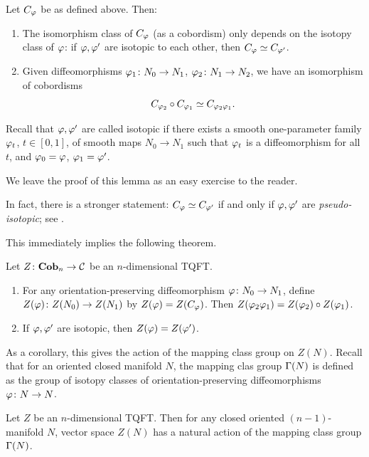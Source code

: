 \begin{lemma}\label{l:tqft-isotopy}
  Let $C_\varphi$ be as defined above. Then:
  \begin{enumerate}
    \item The isomorphism class of $C_\varphi$ \textup{(}as a cobordism\textup{)}
    only depends on the
    isotopy class of $\varphi$: if $\varphi, \varphi'$ are isotopic to each other, then
      $C_\varphi\simeq C_{\varphi'}$.
    \item Given diffeomorphisms $\varphi_1\colon N_0\to N_1$, $\varphi_2\colon N_1\to
      N_2$, we have an isomorphism of cobordisms
      $$
        C_{\varphi_2}\circ C_{\varphi_1}\simeq C_{\varphi_2 \varphi_1}.
      $$
  \end{enumerate}
\end{lemma}
Recall that $\varphi, \varphi'$ are called isotopic if there exists a smooth
one-parameter family $\varphi_t$, $t\in[0,1]$, of smooth maps $N_0\to N_1$ such that
$\varphi_t$ is a diffeomorphism for all $t$, and $\varphi_0=\varphi$, $\varphi_1=\varphi'$.

We leave the proof of this lemma as an easy exercise to the reader.

\begin{remark}\label{r:pseudo-isotopy}
  In fact, there is a stronger statement: $C_\varphi\simeq C_{\varphi'}$ if and only if
  $\varphi, \varphi'$ are \emph{pseudo-isotopic}; see
  \cite[Theorem 1.9]{milnor-h-cobordism}.
\end{remark}




This immediately implies  the following theorem.
\begin{theorem}\label{t:tqft-functoriality}
  Let $Z\colon \mathbf{Cob}_n\to \mathcal{C}$ be an $n$-dimensional TQFT.
  \begin{enumerate}
    \item For any orientation-preserving diffeomorphism $\varphi\colon N_0\to N_1$,
      define $Z(\varphi)\colon Z(N_0)\to Z(N_1)$ by $Z(\varphi)=Z(C_\varphi)$. Then
      $Z(\varphi_2\varphi_1)= Z(\varphi_2)\circ Z(\varphi_1)$.
    \item If $\varphi,\varphi'$ are isotopic, then $Z(\varphi)=Z(\varphi')$.
  \end{enumerate}
\end{theorem}

As a corollary, this gives the action of the mapping class group on $Z(N)$.
Recall that for an oriented  closed manifold $N$, the mapping clas group
 $\Gamma(N)$ is defined as the group of isotopy
classes of orientation-preserving diffeomorphisms $\varphi \colon N\to N$. 



\begin{corollary}\label{c:mapping-class}
  Let $Z$ be an $n$-dimensional TQFT. Then for any closed  oriented $(n-1)$-manifold 
  $N$,  vector space $Z(N)$ has a natural action of the mapping class group $\Gamma(N)$. 
\end{corollary}  

\clearpage
